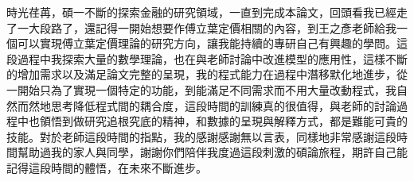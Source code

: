 
\begin{acknowledgement}

時光荏苒，碩一不斷的探索金融的研究領域，一直到完成本論文，回頭看我已經走了一大段路了，還記得一開始想要作傅立葉定價相關的內容，到王之彥老師給我一個可以實現傅立葉定價理論的研究方向，讓我能持續的專研自己有興趣的學問。這段過程中我探索大量的數學理論，也在與老師討論中改進模型的應用性，這樣不斷的增加需求以及滿足論文完整的呈現，我的程式能力在過程中潛移默化地進步，從一開始只為了實現一個特定的功能，到能滿足不同需求而不用大量改動程式，我自然而然地思考降低程式間的耦合度，這段時間的訓練真的很值得，與老師的討論過程中也領悟到做研究追根究底的精神，和數據的呈現與解釋方式，都是難能可貴的技能。對於老師這段時間的指點，我的感謝感謝無以言表，同樣地非常感謝這段時間幫助過我的家人與同學，謝謝你們陪伴我度過這段刺激的碩論旅程，期許自己能記得這段時間的體悟，在未來不斷進步。

\end{acknowledgement}